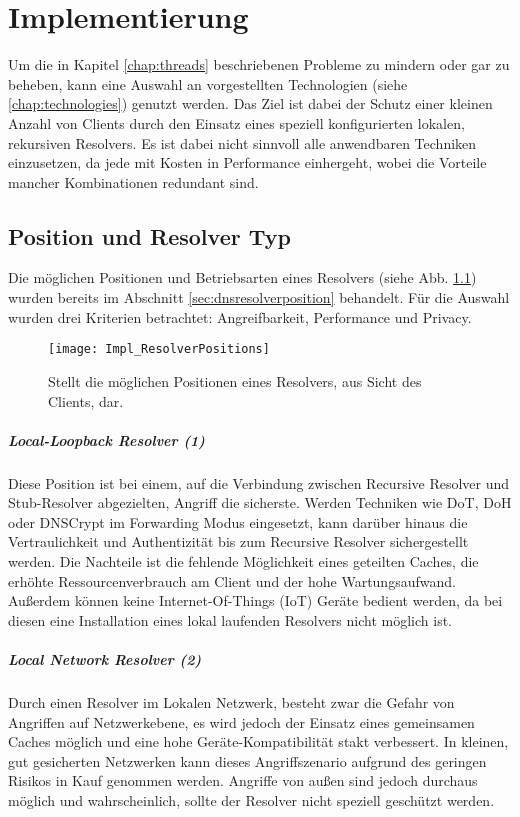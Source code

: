 \chapter{Implementierung}
\label{chap:implementation}

Um die in Kapitel \ref{chap:threads} beschriebenen Probleme zu mindern oder gar zu beheben, kann eine Auswahl an vorgestellten Technologien (siehe \ref{chap:technologies}) genutzt werden. Das Ziel ist dabei der Schutz einer kleinen Anzahl von Clients durch den Einsatz eines speziell konfigurierten lokalen, rekursiven Resolvers. Es ist dabei nicht sinnvoll alle anwendbaren Techniken einzusetzen, da jede mit Kosten in Performance einhergeht, wobei die Vorteile mancher Kombinationen redundant sind.

\section{Position und Resolver Typ}
Die möglichen Positionen und Betriebsarten eines Resolvers (siehe Abb. \ref{img:impl-resolverpositions}) wurden bereits im Abschnitt \ref{sec:dnsresolverposition} behandelt. Für die Auswahl wurden drei Kriterien betrachtet: Angreifbarkeit, Performance und Privacy.
\begin{figure}[hb]
    \centering
    \texttt{[image: Impl\_ResolverPositions]}
    \caption{Stellt die möglichen Positionen eines Resolvers, aus Sicht des Clients, dar.}
    \label{img:impl-resolverpositions}
\end{figure}

\paragraph{Local-Loopback Resolver (1)}
Diese Position ist bei einem, auf die Verbindung zwischen Recursive Resolver und Stub-Resolver abgezielten, Angriff die sicherste. Werden Techniken wie DoT, DoH oder DNSCrypt im Forwarding Modus eingesetzt, kann darüber hinaus die Vertraulichkeit und Authentizität bis zum Recursive Resolver sichergestellt werden. Die Nachteile ist die fehlende Möglichkeit eines geteilten Caches, die erhöhte Ressourcenverbrauch am Client und der hohe Wartungsaufwand. Außerdem können keine Internet-Of-Things (IoT) Geräte bedient werden, da bei diesen eine Installation eines lokal laufenden Resolvers nicht möglich ist.

\paragraph{Local Network Resolver (2)}
Durch einen Resolver im Lokalen Netzwerk, besteht zwar die Gefahr von Angriffen auf Netzwerkebene, es wird jedoch der Einsatz eines gemeinsamen Caches möglich und eine hohe Geräte-Kompatibilität stakt verbessert. In kleinen, gut gesicherten Netzwerken kann dieses Angriffszenario aufgrund des geringen Risikos in Kauf genommen werden. Angriffe von außen sind jedoch durchaus möglich und wahrscheinlich, sollte der Resolver nicht speziell geschützt werden.

